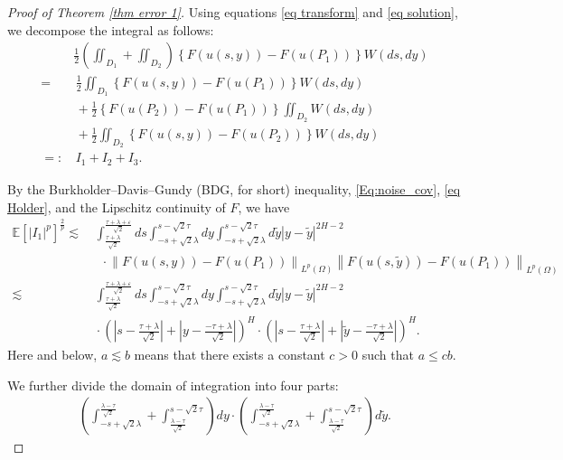 \documentclass[11pt,reqno]{amsart}
\numberwithin{equation}{section}
\newcommand{\1}{{\bf 1}}
\newcommand{\2}{{\bf 2}}
\begin{document}
\begin{proof}[Proof of Theorem \ref{thm error 1}]
Using equations  \eqref{eq transform} and \eqref{eq solution},  we decompose  the integral as follows:
\begin{align*}
 &  \frac{1}{2}\left(\iint_{D_1}+\iint_{D_2} \right)\left\{F(u(s,y))-F(u(P_1)) \right\}W(ds,dy)\\
=&\,  \frac{1}{2} \iint_{D_1} \left\{F(u(s, y))-F(u(P_1))\right\}W(ds,dy)\\
&\, +\frac{1}{2}   \left\{F(u(P_2))- F(u(P_1)) \right\} \iint_{D_2} W(ds,dy)\\
&\, +   \frac{1}{2} \iint_{D_2} \left\{F(u(s,y))-F(u(P_2)) \right\}W(ds,dy)\\
=:&\,  I_1+I_2+I_3.
\end{align*} 

  By the Burkholder–Davis–Gundy (BDG, for short) inequality,       \eqref{Eq:noise_cov},   \eqref{eq Holder},  and the Lipschitz continuity of $F$, we have 
\begin{align*}
 \mathbb{E}\left[\left|I_1\right|^p\right]^{\frac{2}{p}}
 \lesssim &\,   \int_{\frac{\tau+\lambda}{\sqrt 2} }^ \frac{\tau+\lambda+\varepsilon}{\sqrt 2}ds \int_{-s+ \sqrt{2}\lambda}^{s -\sqrt{2}\tau } dy \int_{-s + \sqrt{2}\lambda}^{s -\sqrt{2}\tau}  d\tilde{y}  |y - \tilde{y}|^{2H-2}\\
& \ \ \ \cdot  \left\| F(u(s,y)) - F(u(P_1)) \right\|_{L^p(\Omega)}   
   \left\| F(u(s,\tilde y)) -  F(u(P_1)) \right\|_{L^p(\Omega)}  \\
\lesssim &\,   \int_{\frac{\tau+\lambda}{\sqrt 2} }^ \frac{\tau+\lambda+\varepsilon}{\sqrt 2}ds\int_{-s + \sqrt{2}\lambda}^{s -\sqrt{2}\tau } dy \int_{-s + \sqrt{2}\lambda}^{s -\sqrt{2}\tau}  d\tilde{y}  |y - \tilde{y}|^{2H-2}\\
&\,   \cdot \left( \left| s - \frac{\tau+\lambda}{\sqrt{2}} \right| + \left| y - \frac{-\tau+\lambda}{\sqrt{2}} \right| \right)^{H}  \cdot \left( \left| s- \frac{\tau+\lambda}{\sqrt{2}} \right| + \left| \tilde y - \frac{-\tau+\lambda}{\sqrt{2}} \right| \right)^{H}.
  \end{align*}
  Here and below, $a\lesssim b$ means that there exists a constant $c>0$ such that $a\le c b$.
  
We further  divide the domain  of  integration  into  four parts:
\begin{align*}
    \left(  \int_{-s + \sqrt{2}\lambda}^{\frac{\lambda-\tau}{\sqrt 2} }  +   \int_{\frac{\lambda-\tau}{\sqrt 2}}^{s-\sqrt{2}\tau }    \right) dy \cdot
  \left(  \int_{-s + \sqrt{2}\lambda}^{\frac{\lambda-\tau}{\sqrt 2} }  +   \int_{\frac{\lambda-\tau}{\sqrt 2}}^{s -\sqrt{2}\tau }    \right)   d\tilde{y}.  
  \end{align*}
  

\end{proof}
\end{document}
